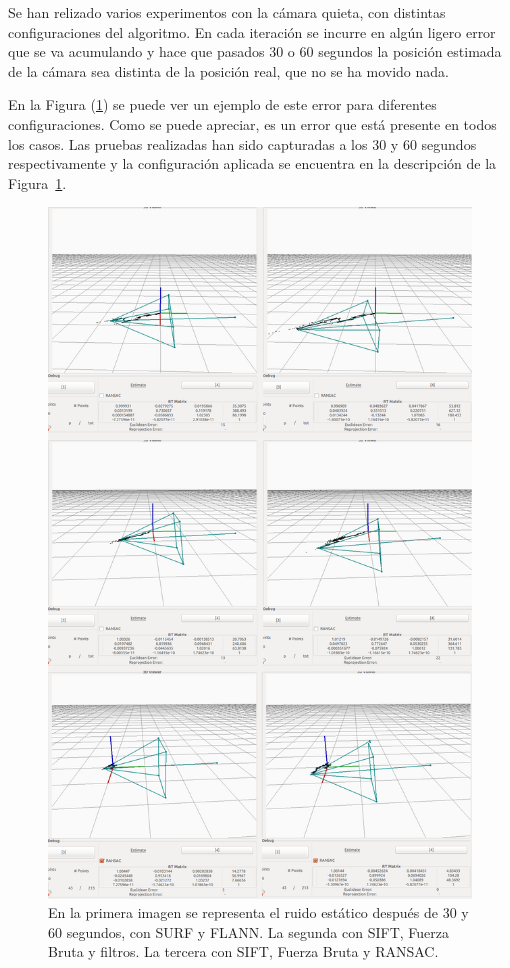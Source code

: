 Se han relizado varios experimentos con la cámara quieta, con distintas configuraciones del algoritmo. En cada iteración se incurre en algún ligero error que se va acumulando y hace que pasados 30 o 60 segundos la posición estimada de la cámara sea distinta de la posición real, que no se ha movido nada.

En la Figura (\ref{fig:static}) se puede ver un ejemplo de este error para diferentes configuraciones. Como se puede apreciar, es un error que está presente en todos los casos. Las pruebas realizadas han sido capturadas a los 30 y 60 segundos respectivamente y la configuración aplicada se encuentra en la descripción de la Figura~\ref{fig:static}.

\begin{figure}[th]
\centering
\includegraphics[scale=0.30]{Figures/tests/static.png}
\decoRule
\caption[Capturas con ruido estático]{En la primera imagen se representa el ruido estático después de 30 y 60 segundos, con SURF y FLANN. La segunda con SIFT, Fuerza Bruta y filtros. La tercera con SIFT, Fuerza Bruta y RANSAC.}
\label{fig:static}
\end{figure}

